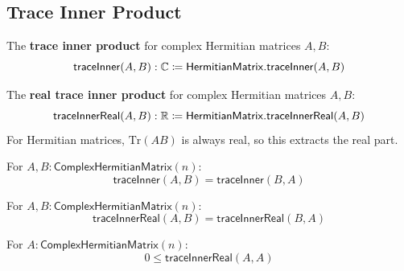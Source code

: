 \subsection{Trace Inner Product}

\begin{definition}[traceInner]
The \textbf{trace inner product} for complex Hermitian matrices $A, B$:
\[ \mathsf{traceInner}(A, B) : \mathbb{C} \coloneqq \mathsf{HermitianMatrix.traceInner}(A, B) \]
\end{definition}

\begin{definition}[traceInnerReal]
The \textbf{real trace inner product} for complex Hermitian matrices $A, B$:
\[ \mathsf{traceInnerReal}(A, B) : \mathbb{R} \coloneqq \mathsf{HermitianMatrix.traceInnerReal}(A, B) \]
For Hermitian matrices, $\mathrm{Tr}(AB)$ is always real, so this extracts the real part.
\end{definition}

\begin{theorem}
For $A, B : \mathsf{ComplexHermitianMatrix}(n)$:
\[ \mathsf{traceInner}(A, B) = \mathsf{traceInner}(B, A) \]
\end{theorem}

\begin{theorem}
For $A, B : \mathsf{ComplexHermitianMatrix}(n)$:
\[ \mathsf{traceInnerReal}(A, B) = \mathsf{traceInnerReal}(B, A) \]
\end{theorem}

\begin{theorem}
For $A : \mathsf{ComplexHermitianMatrix}(n)$:
\[ 0 \le \mathsf{traceInnerReal}(A, A) \]
\end{theorem}
